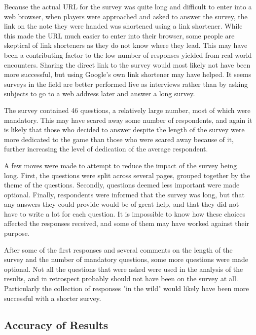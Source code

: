 Because the actual URL for the survey was quite long and difficult to enter into a web browser, when players were approached and asked to answer the survey, the link on the note they were handed was shortened using a link shortener. While this made the URL much easier to enter into their browser, some people are skeptical of link shorteners as they do not know where they lead. This may have been a contributing factor to the low number of responses yielded from real world encounters. Sharing the direct link to the survey would most likely not have been more successful, but using Google's own link shortener may have helped. It seems surveys in the field are better performed live as interviews rather than by asking subjects to go to a web address later and answer a long survey.

The survey contained 46 questions, a relatively large number, most of which were mandatory. This may have scared away some number of respondents, and again it is likely that those who decided to answer despite the length of the survey were more dedicated to the game than those who were scared away because of it, further increasing the level of dedication of the average respondent.

A few moves were made to attempt to reduce the impact of the survey being long. First, the questions were split across several pages, grouped together by the theme of the questions. Secondly, questions deemed less important were made optional. Finally, respondents were informed that the survey was long, but that any answers they could provide would be of great help, and that they did not have to write a lot for each question. It is impossible to know how these choices affected the responses received, and some of them may have worked against their purpose.

After some of the first responses and several comments on the length of the survey and the number of mandatory questions, some more questions were made optional. Not all the questions that were asked were used in the analysis of the results, and in retrospect probably should not have been on the survey at all. Particularly the collection of responses "in the wild" would likely have been more successful with a shorter survey. 

\subsection{Accuracy of Results}

